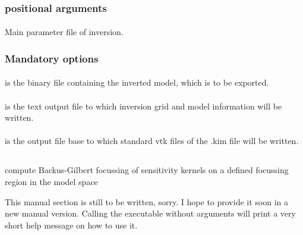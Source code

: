 \subsubsection{positional arguments}
\paragraph{}
Main parameter file of inversion.
\subsubsection{Mandatory options}
\paragraph{}
 is the binary file containing the inverted model, which is to be exported.
\paragraph{}
 is the text output file to which inversion grid and model information will be written.
\paragraph{}
 is the output file base to which standard vtk files of the .kim file will be written.
%
%
\subsection{} \label{programs_scripts,sec:bin_prog,sec:focus_spec_kernel}
compute Backus-Gilbert focussing of sensitivity kernels on a defined focussing region in the model space

This manual section is still to be written, sorry. I hope to provide it soon in a new manual version. %
Calling the executable without arguments will print a very short help message on how to use it.

